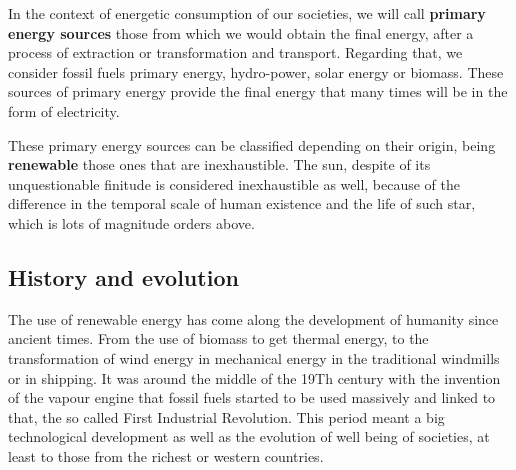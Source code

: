 
In the context of energetic consumption of our societies, we will call \textbf{primary energy sources} those from which we would obtain the final energy, after a process of extraction or transformation and transport. Regarding that, we consider fossil fuels primary energy, hydro-power, solar energy or biomass. These sources of primary energy provide the final energy that many times will be in the form of electricity. 

These primary energy sources can be classified depending on their origin, being \textbf{renewable} those ones that are inexhaustible. The sun, despite of its unquestionable finitude is considered inexhaustible as well, because of the difference in the temporal scale of  human existence and the life of such star, which is lots of magnitude orders above.

\subsection{History and evolution}


The use of renewable energy has come along the development of humanity since ancient times. From the use of biomass to get thermal energy, to the transformation of wind energy in mechanical energy in the traditional windmills or in shipping. It was around the middle of the 19Th century with the invention of the vapour engine that fossil fuels started to be used massively and linked to that, the so called First Industrial Revolution. This period meant a big technological development as well as the evolution of well being of societies, at least to those from the richest or western countries.

